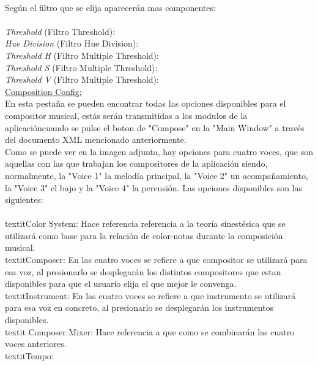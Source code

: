 \newline
\\Según el filtro que se elija aparecerán mas componentes:
\newline
\\
\\\textit{Threshold} (Filtro Threshold): 
\\\textit{Hue Division} (Filtro Hue Division):
\\\textit{Threshold H} (Filtro Multiple Threshold):
\\\textit{Threshold S} (Filtro Multiple Threshold):
\\\textit{Threshold V} (Filtro Multiple Threshold):
\newline
\\\underline{Composition Config:}
\\En esta pestaña se pueden encontrar todas las opciones disponibles para el compositor musical, estás serán transmitidas a los modulos de la aplicacióncuando se pulse el boton de "Compose" en la "Main Window" a través del documento XML mencionado anteriormente.
\\Como se puede ver en la imagen adjunta, hay opciones para cuatro voces, que son aquellas con las que trabajan los compositores de la aplicación siendo, normalmente, la "Voice 1" la melodía principal, la "Voice 2" un acompañamiento, la "Voice 3" el bajo y la "Voice 4" la percusión. Las opciones disponibles son las siguientes:
\\
\newline
\\textit{Color System:} Hace referencia referencia a la teoría sinestésica que se utilizará como base para la relación de color-notas durante la composición musical.
\\textit{Composer:} En las cuatro voces se refiere a que compositor se utilizará para esa voz, al presionarlo se desplegarán los distintos compositores que estan disponibles para que el usuario elija el que mejor le convenga.
\\textit{Instrument:} En las cuatro voces se refiere a que instrumento se utilizará para esa voz en concreto, al presionarlo se desplegarán los instrumentos disponibles.
\\textit {Composer Mixer:} Hace referencia a que como se combinarán las cuatro voces anteriores.
\\textit{Tempo:} 
\\
